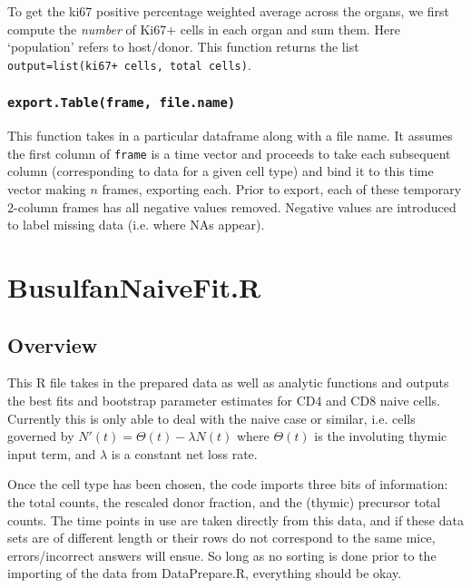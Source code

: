 \documentclass{tufte-book} %
\begin{document}
 To get the ki67 positive percentage weighted average across the organs, we first compute the \textit{number} of Ki67+ cells in each organ and sum them. Here `population' refers to host/donor. This function returns the list \texttt{output=list(ki67+ cells, total  cells)}.

\subsection{\texttt{export.Table(frame, file.name)}} 

This function takes in a particular dataframe along with a file name. It assumes the first column of \texttt{frame} is a time vector and proceeds to take each subsequent column (corresponding to data for a given cell type) and bind it to this time vector making $n$ frames, exporting each. Prior to export, each of these temporary 2-column frames has all negative values removed. Negative values are introduced to label missing data (i.e. where NAs appear).


\chapter{BusulfanNaiveFit.R}
\label{ch:2}


\section{Overview}

\begin{fullwidth}
This R file takes in the prepared data as well as analytic functions and outputs the best fits and bootstrap parameter estimates for CD4 and CD8 naive cells. Currently this is only able to deal with the naive case or similar, i.e. cells governed by $N'(t) = \Theta(t)-\lambda N(t)$ where $\Theta(t)$ is the involuting thymic input term, and $\lambda$ is a constant net loss rate.

Once the cell type has been chosen, the code imports three bits of information: the total counts, the rescaled donor fraction, and the (thymic) precursor total counts. The time points in use are taken directly from this data, and if these data sets are of different length or their rows do not correspond to the same mice, errors/incorrect answers will ensue. So long as no sorting is done prior to the importing of the data from DataPrepare.R, everything should be okay.
\end{fullwidth}
\end{document}
